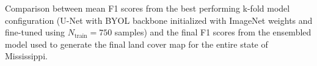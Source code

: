 \begin{table}[H]
    \centering
    \caption{Comparison between mean F1 scores from the best performing k-fold model configuration (U-Net with BYOL backbone initialized with ImageNet weights and fine-tuned using \(N_\text{train} = 750\) samples) and the final F1 scores from the ensembled model used to generate the final land cover map for the entire state of Mississippi.}\label{tab:final_f1_comparison}
\end{table}